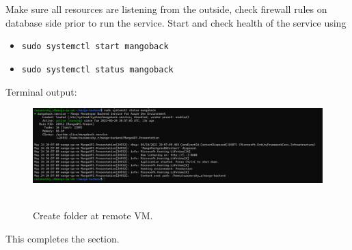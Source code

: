 Make sure all resources are listening from the outside, check firewall rules on database side prior to run the service.
Start and check health of the service using
\begin{itemize}
    \item \texttt{sudo systemctl start mangoback}
    \item \texttt{sudo systemctl status mangoback}
\end{itemize}
Terminal output:
\begin{figure}[H]
    \centering
    \includegraphics[width=1\textwidth]{img/05_ubuntu_service_status}
    ~\caption{Create folder at remote VM.}\label{fig:figure14}
\end{figure}
This completes the section.
